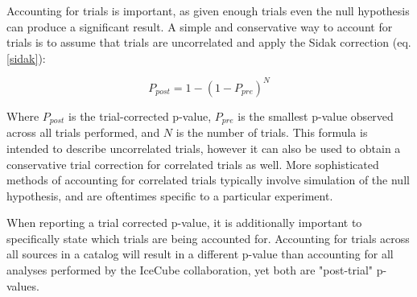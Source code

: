 Accounting for trials is important, as given enough trials even the null hypothesis can produce a significant result. A simple and conservative way to account for trials is to assume that trials are uncorrelated and apply the Sidak correction (eq. \ref{sidak}):

\begin{equation}
    P_{post} = 1-(1-P_{pre})^N
\label{sidak}
\end{equation}

Where $P_{post}$ is the trial-corrected p-value, $P_{pre}$ is the smallest p-value observed across all trials performed, and $N$ is the number of trials. This formula is intended to describe uncorrelated trials, however it can also be used to obtain a conservative trial correction for correlated trials as well. More sophisticated methods of accounting for correlated trials typically involve simulation of the null hypothesis, and are oftentimes specific to a particular experiment. 

When reporting a trial corrected p-value, it is additionally important to specifically state which trials are being accounted for. Accounting for trials across all sources in a catalog will result in a different p-value than accounting for all analyses performed by the IceCube collaboration, yet both are "post-trial" p-values. 

